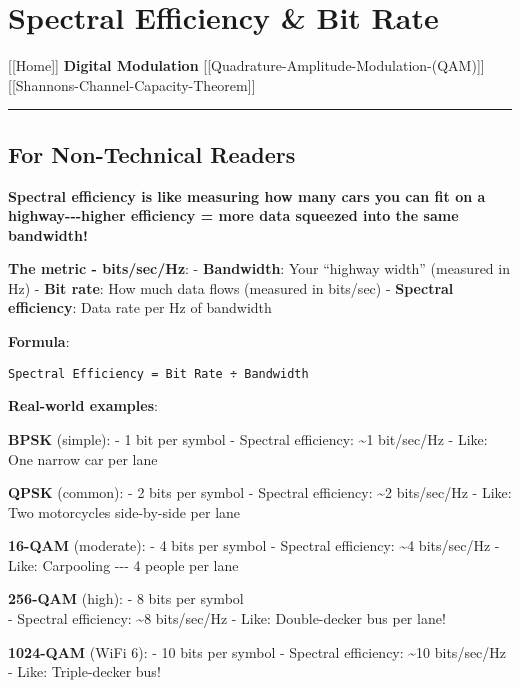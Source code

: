 \section{Spectral Efficiency \& Bit
Rate}\label{spectral-efficiency-bit-rate}

{[}{[}Home{]}{]} \textbar{} \textbf{Digital Modulation} \textbar{}
{[}{[}Quadrature-Amplitude-Modulation-(QAM){]}{]} \textbar{}
{[}{[}Shannon\textquotesingle s-Channel-Capacity-Theorem{]}{]}

\begin{center}\rule{0.5\linewidth}{0.5pt}\end{center}

\subsection{\texorpdfstring{ For Non-Technical
Readers}{ For Non-Technical Readers}}\label{for-non-technical-readers}

\textbf{Spectral efficiency is like measuring how many cars you can fit
on a highway-\/-\/-higher efficiency = more data squeezed into the same
bandwidth!}

\textbf{The metric - bits/sec/Hz}: - \textbf{Bandwidth}: Your ``highway
width'' (measured in Hz) - \textbf{Bit rate}: How much data flows
(measured in bits/sec) - \textbf{Spectral efficiency}: Data rate per Hz
of bandwidth

\textbf{Formula}:

\begin{verbatim}
Spectral Efficiency = Bit Rate ÷ Bandwidth
\end{verbatim}

\textbf{Real-world examples}:

\textbf{BPSK} (simple): - 1 bit per symbol - Spectral efficiency:
\textasciitilde1 bit/sec/Hz - Like: One narrow car per lane

\textbf{QPSK} (common): - 2 bits per symbol - Spectral efficiency:
\textasciitilde2 bits/sec/Hz - Like: Two motorcycles side-by-side per
lane

\textbf{16-QAM} (moderate): - 4 bits per symbol - Spectral efficiency:
\textasciitilde4 bits/sec/Hz - Like: Carpooling -\/-\/- 4 people per
lane

\textbf{256-QAM} (high): - 8 bits per symbol\\
- Spectral efficiency: \textasciitilde8 bits/sec/Hz - Like:
Double-decker bus per lane!

\textbf{1024-QAM} (WiFi 6): - 10 bits per symbol - Spectral efficiency:
\textasciitilde10 bits/sec/Hz - Like: Triple-decker bus!

